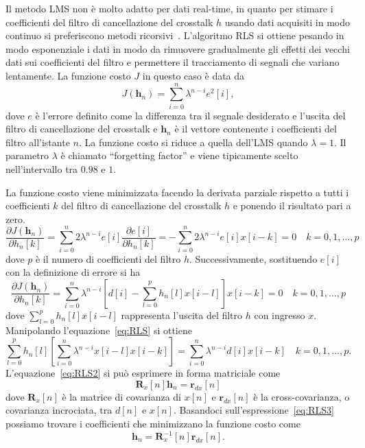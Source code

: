 \documentclass[12pt,a4paper,titlepage]{article}
\begin{document}
Il metodo LMS non è molto adatto per dati real-time, in quanto per stimare i coefficienti del filtro di cancellazione del crosstalk $h$ usando dati acquisiti in modo continuo si preferiscono metodi ricorsivi~\cite{Ifeachor:DSP}. L'algoritmo RLS si ottiene pesando in modo esponenziale i dati in modo da rimuovere gradualmente gli effetti dei vecchi dati sui coefficienti del filtro e permettere il tracciamento di segnali che variano lentamente. La funzione costo $J$ in questo caso è data da
\begin{equation*}
J(\mathbf{h}_n) = \sum_{i = 0}^{n} \lambda^{n-i}e^2[i],
\end{equation*}
dove $e$ è l'errore definito come la differenza tra il segnale desiderato e l'uscita del filtro di cancellazione del crosstalk e $\mathbf{h}_n$ è il vettore contenente i coefficienti del filtro all'istante $n$. La funzione costo si riduce a quella dell'LMS quando $\lambda = 1$. Il parametro $\lambda$ è chiamato ``forgetting factor'' e viene tipicamente scelto nell'intervallo tra $0.98$ e $1$. 

La funzione costo viene minimizzata facendo la derivata parziale rispetto a tutti i coefficienti $k$ del filtro di cancellazione del crosstalk $h$ e ponendo il risultato pari a zero.
\begin{equation*}
\dfrac{\partial J(\mathbf{h}_n)}{\partial h_n[k]} =  \sum_{i = 0}^{n} 2\lambda^{n-i}e[i]\dfrac{\partial e[i]}{\partial h_n[k]} = - \sum_{i = 0}^{n} 2\lambda^{n-i}e[i]x[i-k] = 0 \quad k = 0, 1, \dots, p
\end{equation*}
dove $p$ è il numero di coefficienti del filtro $h$. Successivamente, sostituendo $e[i]$ con la definizione di errore si ha
\begin{equation}\label{eq:RLS}
\dfrac{\partial J(\mathbf{h}_n)}{\partial h_n[k]} = \sum_{i = 0}^{n}\lambda^{n-i}\left[d[i] -\sum_{l=0}^{p} {h_n[l]x[i-l]}\right] x[i-k] = 0 \quad k = 0, 1, \dots, p
\end{equation} 
dove $\sum_{l=0}^{p} {h_n[l]x[i-l]}$ rappresenta l'uscita del filtro $h$ con ingresso $x$. Manipolando l'equazione~\eqref{eq:RLS} si ottiene
\begin{equation}\label{eq:RLS2}
\sum_{l=0}^{p} {h_n[l]} \left[\sum_{i=0}^{n} \lambda^{n-i}x[i-l]x[i-k]\right] = \sum_{i=0}^{n} \lambda^{n-i} d[i]x[i-k] \quad k = 0, 1,\dots, p.
\end{equation}\label{eq:RLS3}
L'equazione~\eqref{eq:RLS2} si può esprimere in forma matriciale come
\begin{equation}
\mathbf{R}_x[n]\mathbf{h}_n = \mathbf{r}_{dx}[n]
\end{equation}
dove $\mathbf{R}_x[n]$ è la matrice di covarianza di $x[n]$ e $\mathbf{r}_{dx}[n]$ è la cross-covarianza, o covarianza incrociata, tra $d[n]$ e $x[n]$. Basandoci sull'espressione~\eqref{eq:RLS3} possiamo trovare i coefficienti che minimizzano la funzione costo come 
\begin{equation*}
\mathbf{h}_n = \mathbf{R}^{-1}_x[n]\mathbf{r}_{dx}[n].
\end{equation*}
\end{document}
